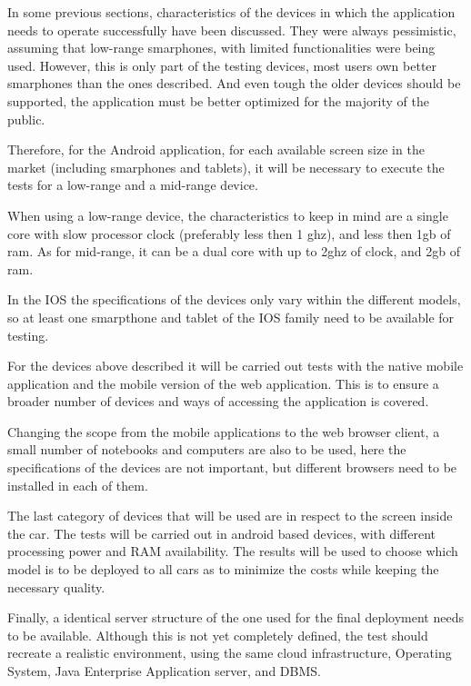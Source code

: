 \documentclass[a4paper]{article}
\begin{document}
In some previous sections, characteristics of the devices in which the application needs to operate successfully have been discussed. They were always pessimistic, assuming that low-range smarphones, with limited functionalities were being used. However, this is only part of the testing devices, most users own better smarphones than the ones described. And even tough the older devices should be supported, the application must be better optimized for the majority of the public.

Therefore, for the Android application, for each available screen size in the market (including smarphones and tablets), it will be necessary to execute the tests for a low-range and a mid-range device.  

When using a low-range device, the characteristics to keep in mind are a single core with slow processor clock (preferably less then 1 ghz), and less then 1gb of ram. As for mid-range, it can be a dual core with up to 2ghz of clock, and 2gb of ram.  

In the IOS the specifications of the devices only vary within the different models, so at least one smarpthone and tablet of the IOS family need to be available for testing.

For the devices above described it will be carried out tests with the native mobile application and the mobile version of the web application. This is to ensure a broader number of devices and ways of accessing the application is covered.

Changing the scope from the mobile applications to the web browser client, a small number of notebooks and computers are also to be used, here the specifications of the devices are not important, but different browsers need to be installed in each of them. 

The last category of devices that will be used are in respect to the screen inside the car.  The tests will be carried out in android based devices, with different processing power and RAM availability. The results will be used to choose which model is to be deployed to all cars as to minimize the costs while keeping the necessary quality.

Finally, a identical server structure of the one used for the final deployment needs to be available. Although this is not yet completely defined, the test should recreate a realistic environment, using the same cloud infrastructure, Operating System, Java Enterprise Application server, and DBMS. 
\newpage
\end{document}
